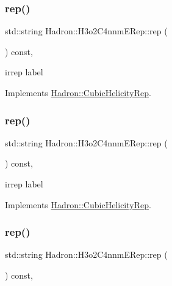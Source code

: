 \mbox{\label{structHadron_1_1H3o2C4nnmERep_af384ff99c3d56a172c61764888b2999b}} 
\subsubsection{\texorpdfstring{rep()}{rep()}\hspace{0.1cm}{\footnotesize\ttfamily [1/3]}}
{\footnotesize\ttfamily std\+::string Hadron\+::\+H3o2\+C4nnm\+E\+Rep\+::rep (\begin{DoxyParamCaption}{ }\end{DoxyParamCaption}) const\hspace{0.3cm}{\ttfamily [inline]}, {\ttfamily [virtual]}}

irrep label 

Implements \mbox{\hyperlink{structHadron_1_1CubicHelicityRep_a8cdd86f068a167dc96faef02bfb8a33d}{Hadron\+::\+Cubic\+Helicity\+Rep}}.

\mbox{\label{structHadron_1_1H3o2C4nnmERep_af384ff99c3d56a172c61764888b2999b}} 
\subsubsection{\texorpdfstring{rep()}{rep()}\hspace{0.1cm}{\footnotesize\ttfamily [2/3]}}
{\footnotesize\ttfamily std\+::string Hadron\+::\+H3o2\+C4nnm\+E\+Rep\+::rep (\begin{DoxyParamCaption}{ }\end{DoxyParamCaption}) const\hspace{0.3cm}{\ttfamily [inline]}, {\ttfamily [virtual]}}

irrep label 

Implements \mbox{\hyperlink{structHadron_1_1CubicHelicityRep_a8cdd86f068a167dc96faef02bfb8a33d}{Hadron\+::\+Cubic\+Helicity\+Rep}}.

\mbox{\label{structHadron_1_1H3o2C4nnmERep_af384ff99c3d56a172c61764888b2999b}} 
\subsubsection{\texorpdfstring{rep()}{rep()}\hspace{0.1cm}{\footnotesize\ttfamily [3/3]}}
{\footnotesize\ttfamily std\+::string Hadron\+::\+H3o2\+C4nnm\+E\+Rep\+::rep (\begin{DoxyParamCaption}{ }\end{DoxyParamCaption}) const\hspace{0.3cm}{\ttfamily [inline]}, {\ttfamily [virtual]}}

